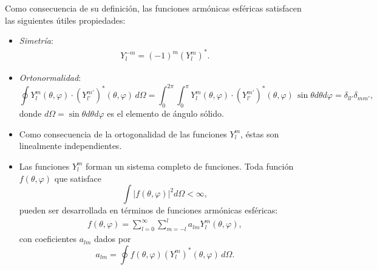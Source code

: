 Como consecuencia de su definición, las funciones armónicas esféricas satisfacen las siguientes útiles
propiedades:
 \begin{itemize}
  \item \textit{Simetría}:
   \begin{eqnarray}
    Y_l^{-m} = (-1)^m (Y_l^m)^*.\label{kugel2}
   \end{eqnarray}
  \item \textit{Ortonormalidad}:
  \begin{equation}
  \oint Y_l^m (\theta,\varphi)\cdot (Y_{l'}^{m'})^*(\theta,\varphi)\, d\Omega
=\int_0^{2\pi}\int_0^\pi Y_l^m (\theta,\varphi)  \cdot
(Y_{l'}^{m'})^*(\theta,\varphi)\, \sin\theta d\theta d\varphi   =
\delta_{ll'}\delta_{mm'},
\label{est33}
\end{equation}
 donde $d\Omega = \sin\theta d\theta d\varphi$ es el elemento de ángulo
sólido.

\item Como consecuencia de la ortogonalidad de las funciones $Y_l^m$, éstas son linealmente independientes.

 \item Las funciones $Y_l^m $ forman un sistema completo de funciones. Toda
función $f(\theta,\varphi)$ que satisface
\begin{equation}
    \int |f(\theta,\varphi)|^2 d\Omega <\infty,
\end{equation}
pueden ser desarrollada en términos de funciones armónicas esféricas:
\begin{eqnarray}
f(\theta,\varphi) = \sum_{l=0}^\infty\sum_{m=-l}^l a_{lm}Y_l^m (\theta,\varphi),
\end{eqnarray}
con coeficientes $a_{lm}$ dados por
\begin{equation}
a_{lm}=\oint f(\theta,\varphi)(Y_{l}^{m})^*(\theta,\varphi)\,d\Omega.
\end{equation}


\end{itemize}
